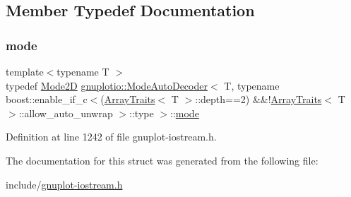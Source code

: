 \subsection{Member Typedef Documentation}
\mbox{\label{structgnuplotio_1_1_mode_auto_decoder_3_01_t_00_01typename_01boost_1_1enable__if__c_3_07_array_t40de9ad20cf29b501e884c0f76d7ac36_a4a741dbcbd1404fdfef24420a7867d26}} 
\subsubsection{\texorpdfstring{mode}{mode}}
{\footnotesize\ttfamily template$<$typename T $>$ \\
typedef \hyperlink{structgnuplotio_1_1_mode2_d}{Mode2D} \hyperlink{structgnuplotio_1_1_mode_auto_decoder}{gnuplotio\+::\+Mode\+Auto\+Decoder}$<$ T, typename boost\+::enable\+\_\+if\+\_\+c$<$(\hyperlink{classgnuplotio_1_1_array_traits}{Array\+Traits}$<$ T $>$\+::depth==2) \&\&!\hyperlink{classgnuplotio_1_1_array_traits}{Array\+Traits}$<$ T $>$\+::allow\+\_\+auto\+\_\+unwrap $>$\+::type $>$\+::\hyperlink{structgnuplotio_1_1_mode_auto_decoder_3_01_t_00_01typename_01boost_1_1enable__if__c_3_07_array_t40de9ad20cf29b501e884c0f76d7ac36_a4a741dbcbd1404fdfef24420a7867d26}{mode}}



Definition at line 1242 of file gnuplot-\/iostream.\+h.



The documentation for this struct was generated from the following file\+:\begin{DoxyCompactItemize}
\item 
include/\hyperlink{gnuplot-iostream_8h}{gnuplot-\/iostream.\+h}\end{DoxyCompactItemize}
